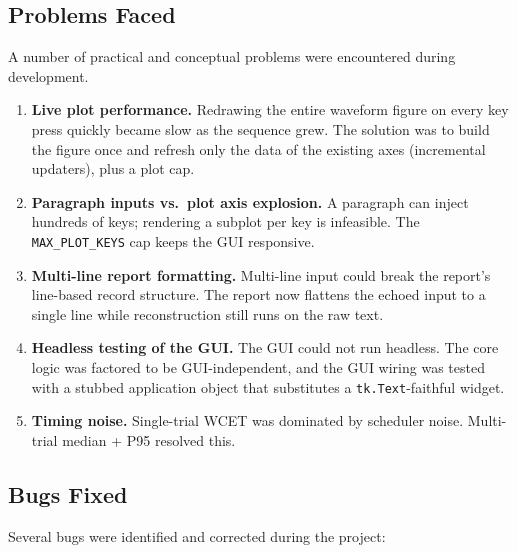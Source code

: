 \documentclass[11pt,a4paper]{article}
\begin{document}
\subsection{Problems Faced}

A number of practical and conceptual problems were encountered during
development.

\begin{enumerate}
    \item \textbf{Live plot performance.} Redrawing the entire waveform figure
          on every key press quickly became slow as the sequence grew. The
          solution was to build the figure once and refresh only the data of
          the existing axes (incremental updaters), plus a plot cap.
    \item \textbf{Paragraph inputs vs.\ plot axis explosion.} A paragraph can
          inject hundreds of keys; rendering a subplot per key is infeasible.
          The \texttt{MAX\_PLOT\_KEYS} cap keeps the GUI responsive.
    \item \textbf{Multi-line report formatting.} Multi-line input could break
          the report's line-based record structure. The report now flattens the
          echoed input to a single line while reconstruction still runs on the
          raw text.
    \item \textbf{Headless testing of the GUI.} The GUI could not run headless.
          The core logic was factored to be GUI-independent, and the GUI wiring
          was tested with a stubbed application object that substitutes a
          \texttt{tk.Text}-faithful widget.
    \item \textbf{Timing noise.} Single-trial WCET was dominated by scheduler
          noise. Multi-trial median + P95 resolved this.
\end{enumerate}

\subsection{Bugs Fixed}

Several bugs were identified and corrected during the project:
\end{document}

